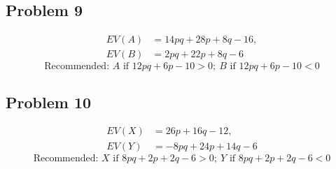 \subsection*{Problem 9}
\[
\begin{aligned}
	EV(A) &= 14pq+28p+8q-16,\\
	EV(B) &= 2pq+22p+8q-6
\end{aligned}
\]
\[
\text{Recommended: } A \text{ if } 12pq+6p-10>0;\ B \text{ if } 12pq+6p-10<0
\]

\subsection*{Problem 10}
\[
\begin{aligned}
	EV(X) &= 26p+16q-12,\\
	EV(Y) &= -8pq+24p+14q-6
\end{aligned}
\]
\[
\text{Recommended: } X \text{ if } 8pq+2p+2q-6>0;\ Y \text{ if } 8pq+2p+2q-6<0
\]


